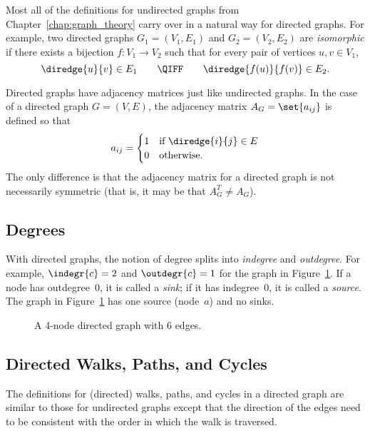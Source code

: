Most all of the definitions for undirected graphs from
Chapter~\ref{chap:graph_theory} carry over in a natural way for
directed graphs.  For example, two directed graphs $G_1 = (V_1, E_1)$
and $G_2 = (V_2, E_2)$ are \emph{isomorphic} if there exists a
bijection $f: V_1 \to V_2$ such that for every pair of vertices $u, v
\in V_1$,
\begin{equation*}
    \diredge{u}{v} \in E_1 \qquad \QIFF \qquad \diredge{f(u)}{f(v)} \in E_2.
\end{equation*}

Directed graphs have adjacency matrices just like undirected graphs.
In the case of a directed graph $G = (V, E)$, the adjacency matrix
$A_G = \set{ a_{ij} }$ is defined so that
\begin{equation*}
    a_{ij} = \begin{cases}
                1 & \text{if $\diredge{i}{j} \in E$} \\
                0 & \text{otherwise.}
              \end{cases}
\end{equation*}
The only difference is that the adjacency matrix for a directed graph
is not necessarily symmetric (that is, it may be that
$A_{G}^{T} \ne A_G$).

\subsection{Degrees}

With directed graphs, the notion of degree splits into \emph{indegree}
and \emph{outdegree}.  For example, $\indegr{c} = 2$ and $\outdegr{c}
= 1$ for the graph in Figure~\ref{fig:6EB}.  If a node has
outdegree~0, it is called a \emph{sink}; if it has indegree~0, it is
called a \emph{source}.  The graph in Figure~\ref{fig:6EB} has one
source (node~$a$) and no sinks.

\begin{figure}


\caption{A 4-node directed graph with 6 edges.}

\label{fig:6EB}

\end{figure}

\subsection{Directed Walks, Paths, and Cycles}

The definitions for (directed) walks, paths, and cycles in a directed
graph are similar to those for undirected graphs except that the
direction of the edges need to be consistent with the order in which
the walk is traversed.

